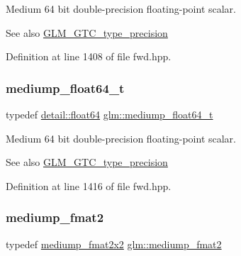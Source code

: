 Medium 64 bit double-\/precision floating-\/point scalar. \begin{DoxySeeAlso}{See also}
\hyperlink{group__gtc__type__precision}{G\+L\+M\+\_\+\+G\+T\+C\+\_\+type\+\_\+precision} 
\end{DoxySeeAlso}


Definition at line 1408 of file fwd.\+hpp.

\mbox{\label{group__gtc__type__precision_ga97a0747b103eb5ef320a91888de52f51}} 
\subsubsection{\texorpdfstring{mediump\+\_\+float64\+\_\+t}{mediump\_float64\_t}}
{\footnotesize\ttfamily typedef \hyperlink{namespaceglm_1_1detail_a5a0a9a1be3fd5dbe6d47ae45c3022b06}{detail\+::float64} \hyperlink{group__gtc__type__precision_ga97a0747b103eb5ef320a91888de52f51}{glm\+::mediump\+\_\+float64\+\_\+t}}

Medium 64 bit double-\/precision floating-\/point scalar. \begin{DoxySeeAlso}{See also}
\hyperlink{group__gtc__type__precision}{G\+L\+M\+\_\+\+G\+T\+C\+\_\+type\+\_\+precision} 
\end{DoxySeeAlso}


Definition at line 1416 of file fwd.\+hpp.

\mbox{\label{group__gtc__type__precision_ga5b9de77ef7403ffc972700219eca5450}} 
\subsubsection{\texorpdfstring{mediump\+\_\+fmat2}{mediump\_fmat2}}
{\footnotesize\ttfamily typedef \hyperlink{group__gtc__type__precision_gae9af1d96efbaeeb5c5edd9c7b0a24fa5}{mediump\+\_\+fmat2x2} \hyperlink{group__gtc__type__precision_ga5b9de77ef7403ffc972700219eca5450}{glm\+::mediump\+\_\+fmat2}}

